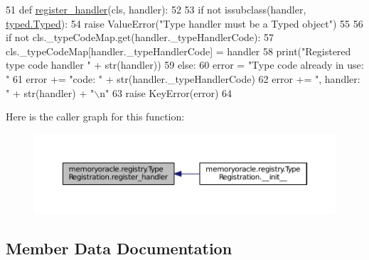 \begin{DoxyCode}
51     \textcolor{keyword}{def }\hyperlink{classmemoryoracle_1_1registry_1_1TypeRegistration_a3f017524239fb80650039bd4ab927f73}{register\_handler}(cls, handler):
52 
53         \textcolor{keywordflow}{if} \textcolor{keywordflow}{not} issubclass(handler, \hyperlink{classmemoryoracle_1_1typed_1_1Typed}{typed.Typed}):
54             \textcolor{keywordflow}{raise} ValueError(\textcolor{stringliteral}{"Type handler must be a Typed object"})
55 
56         \textcolor{keywordflow}{if} \textcolor{keywordflow}{not} cls.\_typeCodeMap.get(handler.\_typeHandlerCode):
57             cls.\_typeCodeMap[handler.\_typeHandlerCode] = handler
58             print(\textcolor{stringliteral}{"Registered type code handler "} + str(handler))
59         \textcolor{keywordflow}{else}:
60             error = \textcolor{stringliteral}{"Type code already in use: "}
61             error += \textcolor{stringliteral}{"code: "} + str(handler.\_typeHandlerCode)
62             error += \textcolor{stringliteral}{", handler: "} + str(handler) + \textcolor{stringliteral}{"\(\backslash\)n"}
63             \textcolor{keywordflow}{raise} KeyError(error)
64 
\end{DoxyCode}


Here is the caller graph for this function\+:
\nopagebreak
\begin{figure}[H]
\begin{center}
\leavevmode
\includegraphics[width=350pt]{classmemoryoracle_1_1registry_1_1TypeRegistration_a3f017524239fb80650039bd4ab927f73_icgraph}
\end{center}
\end{figure}




\subsection{Member Data Documentation}
\hypertarget{classmemoryoracle_1_1registry_1_1TypeRegistration_a08416d99733193baf2dec4208043c793}{}
